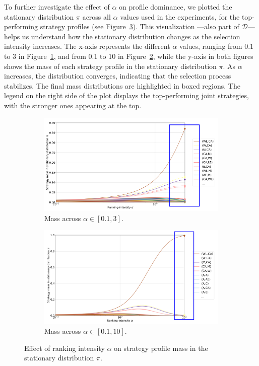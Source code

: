        \noindent
        To further investigate the effect of $\alpha$ on profile dominance, we plotted the stationary distribution $\pi$ across all $\alpha$ values used in the experiments, for the top-performing strategy profiles (see Figure~\ref{fig:alpha_x_pi}). This visualization —also part of $\mathcal{D}$— helps us understand how the stationary distribution changes as the selection intensity increases. The x-axis represents the different $\alpha$ values, ranging from $0.1$ to $3$ in Figure~\ref{fig:alpha_x_pi_3}, and from $0.1$ to $10$ in Figure~\ref{fig:alpha_x_pi_10}, while the y-axis in both figures shows the mass of each strategy profile in the stationary distribution $\pi$. As $\alpha$ increases, the distribution converges, indicating that the selection process stabilizes. The final mass distributions are highlighted in boxed regions. The legend on the right side of the plot displays the top-performing joint strategies, with the stronger ones appearing at the top.
        \begin{figure}[H]
            \centering
            \begin{subfigure}[b]{0.49\linewidth}
                \includegraphics[width=\linewidth]{images/alpha_x_pi_3.png}
                \caption{Mass across $\alpha \in [0.1, 3]$.}
                \label{fig:alpha_x_pi_3}
            \end{subfigure}
            \hfill
            \begin{subfigure}[b]{0.49\linewidth}
                \includegraphics[width=\linewidth]{images/alpha_x_pi_10.png}
                \caption{Mass across $\alpha \in [0.1, 10]$.}
                \label{fig:alpha_x_pi_10}
            \end{subfigure}
            \caption{Effect of ranking intensity $\alpha$ on strategy profile mass in the stationary distribution $\pi$.}
            \label{fig:alpha_x_pi}
        \end{figure}
